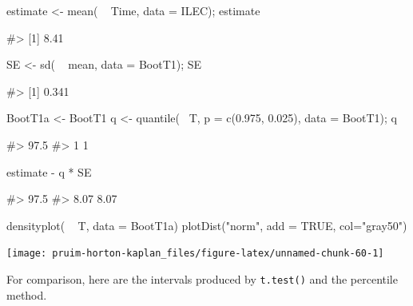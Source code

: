 \begin{Schunk}
\begin{Sinput}
estimate <- mean( ~ Time, data = ILEC); estimate
\end{Sinput}
\begin{Soutput}
#> [1] 8.41
\end{Soutput}
\begin{Sinput}
SE <- sd( ~ mean, data = BootT1); SE
\end{Sinput}
\begin{Soutput}
#> [1] 0.341
\end{Soutput}
\begin{Sinput}
BootT1a <- BootT1 %
q <- quantile(~ T, p = c(0.975, 0.025), data = BootT1); q
\end{Sinput}
\begin{Soutput}
#> 97.5%
#>     1     1
\end{Soutput}
\begin{Sinput}
estimate - q * SE
\end{Sinput}
\begin{Soutput}
#> 97.5%
#>  8.07  8.07
\end{Soutput}
\begin{Sinput}
densityplot( ~ T, data = BootT1a)
plotDist("norm", add = TRUE, col="gray50")
\end{Sinput}


\begin{center}\texttt{[image: pruim-horton-kaplan\_files/figure-latex/unnamed-chunk-60-1]} \end{center}

\end{Schunk}

For comparison, here are the intervals produced by \texttt{t.test()} and
the percentile method.

